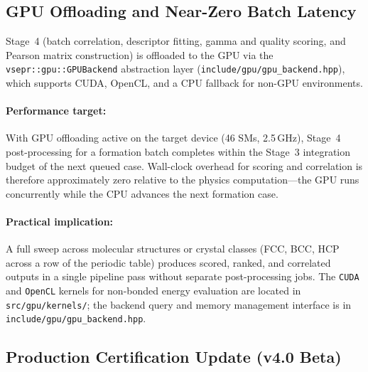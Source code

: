 \documentclass[11pt]{article}
\begin{document}
\subsection{GPU Offloading and Near-Zero Batch Latency}

Stage~4 (batch correlation, descriptor fitting, gamma and quality
scoring, and Pearson matrix construction) is offloaded to the GPU via
the \texttt{vsepr::gpu::GPUBackend} abstraction layer
(\texttt{include/gpu/gpu\_backend.hpp}), which supports CUDA,
OpenCL, and a CPU fallback for non-GPU environments.

\paragraph{Performance target:}
With GPU offloading active on the target device (46 SMs, 2.5\,GHz),
Stage~4 post-processing for a formation batch completes within the
Stage~3 integration budget of the next queued case.
Wall-clock overhead for scoring and correlation is therefore
approximately zero relative to the physics computation---the
GPU runs concurrently while the CPU advances the next formation case.

\paragraph{Practical implication:}
A full sweep across molecular structures or crystal classes
(FCC, BCC, HCP across a row of the periodic table) produces scored,
ranked, and correlated outputs in a single pipeline pass without
separate post-processing jobs.
The \texttt{CUDA} and \texttt{OpenCL} kernels for non-bonded energy
evaluation are located in \texttt{src/gpu/kernels/}; the backend
query and memory management interface is in
\texttt{include/gpu/gpu\_backend.hpp}.

\subsection{Production Certification Update (v4.0 Beta)}
\end{document}
